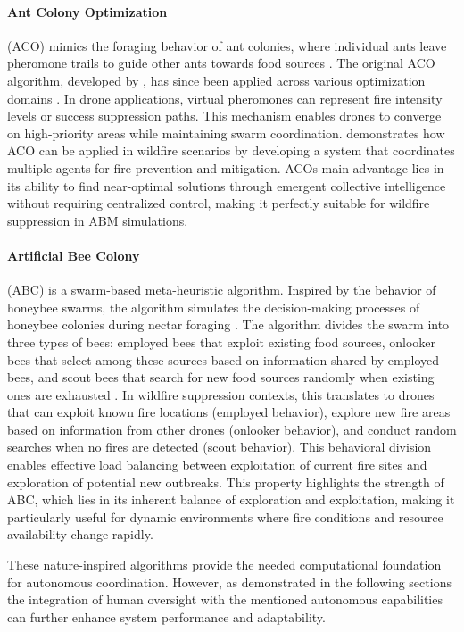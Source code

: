 \documentclass[twoside]{article}
\begin{document}
\paragraph{Ant Colony Optimization} (ACO) mimics the foraging behavior of ant colonies, where individual ants leave pheromone trails to guide other ants towards food sources \citep{ACO}. The original ACO algorithm, developed by \citet*{ACO}, has since been applied across various optimization domains \citep{ACO_recent_advances}.
In drone applications, virtual pheromones can represent fire intensity levels or success suppression paths. This mechanism enables drones to converge on high-priority areas while maintaining swarm coordination.
\citet*{HybridAntColonyWildfire} demonstrates how ACO can be applied in wildfire scenarios by developing a system that coordinates multiple agents for fire prevention and mitigation. ACOs main advantage lies in its ability to find near-optimal solutions through emergent collective intelligence without requiring centralized control, making it perfectly suitable for wildfire suppression in ABM simulations.


\paragraph{Artificial Bee Colony} (ABC) is a swarm-based meta-heuristic algorithm. Inspired by the behavior of honeybee swarms, the algorithm simulates the decision-making processes of honeybee colonies during nectar foraging \citep{karaboga2007abc}. The algorithm divides the swarm into three types of bees: employed bees that exploit existing food sources, onlooker bees that select among these sources based on information shared by employed bees, and scout bees that search for new food sources randomly when existing ones are exhausted \citep{karaboga2007abc}.
In wildfire suppression contexts, this translates to drones that can exploit known fire locations (employed behavior), explore new fire areas based on information from other drones (onlooker behavior), and conduct random searches when no fires are detected (scout behavior). This behavioral division enables effective load balancing between exploitation of current fire sites and exploration of potential new outbreaks. This property highlights the strength of ABC, which lies in its inherent balance of exploration and exploitation, making it particularly useful for dynamic environments where fire conditions and resource availability change rapidly.

These nature-inspired algorithms provide the needed computational foundation for autonomous coordination. However, as demonstrated in the following sections the integration of human oversight with the mentioned autonomous capabilities can further enhance system performance and adaptability.
\end{document}

